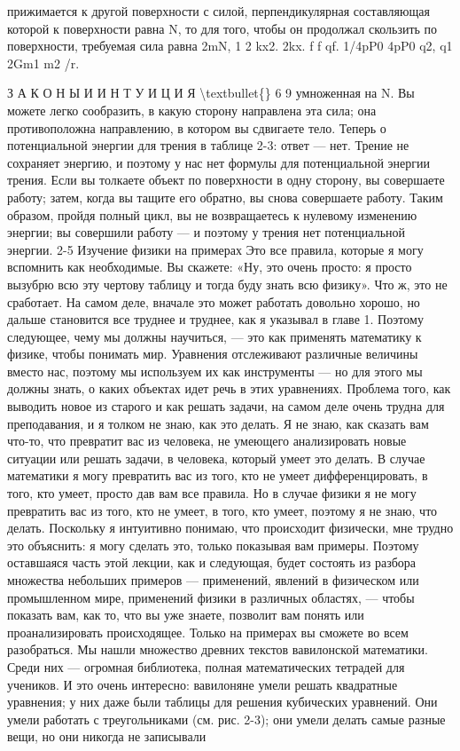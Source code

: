 \documentclass[10pt,oneside]{article}
\begin{document}
прижимается к другой поверхности с силой, перпендикулярная составляющая которой к поверхности равна N, то для того, чтобы он продолжал скользить по поверхности, требуемая сила равна 2mN, 1 2 kx2. 2kx. f f qf. 1/4pP0 4pP0 q2, q1 2Gm1  m2  /r.\par

З А К О Н Ы  И  И Н Т У И Ц И Я \textbackslash{}textbullet\{\} 6 9 умноженная на N. Вы можете легко сообразить, в какую сторону направлена эта сила; она противоположна направлению, в котором вы сдвигаете тело. Теперь о потенциальной энергии для трения в таблице 2-3: ответ --- нет. Трение не сохраняет энергию, и поэтому у нас нет формулы для потенциальной энергии трения. Если вы толкаете объект по поверхности в одну сторону, вы совершаете работу; затем, когда вы тащите его обратно, вы снова совершаете работу. Таким образом, пройдя полный цикл, вы не возвращаетесь к нулевому изменению энергии; вы совершили работу --- и поэтому у трения нет потенциальной энергии. 2-5 Изучение физики на примерах Это все правила, которые я могу вспомнить как необходимые. Вы скажете: «Ну, это очень просто: я просто вызубрю всю эту чертову таблицу и тогда буду знать всю физику». Что ж, это не сработает. На самом деле, вначале это может работать довольно хорошо, но дальше становится все труднее и труднее, как я указывал в главе 1. Поэтому следующее, чему мы должны научиться, --- это как применять математику к физике, чтобы понимать мир. Уравнения отслеживают различные величины вместо нас, поэтому мы используем их как инструменты --- но для этого мы должны знать, о каких объектах идет речь в этих уравнениях. Проблема того, как выводить новое из старого и как решать задачи, на самом деле очень трудна для преподавания, и я толком не знаю, как это делать. Я не знаю, как сказать вам что-то, что превратит вас из человека, не умеющего анализировать новые ситуации или решать задачи, в человека, который умеет это делать. В случае математики я могу превратить вас из того, кто не умеет дифференцировать, в того, кто умеет, просто дав вам все правила. Но в случае физики я не могу превратить вас из того, кто не умеет, в того, кто умеет, поэтому я не знаю, что делать. Поскольку я интуитивно понимаю, что происходит физически, мне трудно это объяснить: я могу сделать это, только показывая вам примеры. Поэтому оставшаяся часть этой лекции, как и следующая, будет состоять из разбора множества небольших примеров --- применений, явлений в физическом или промышленном мире, применений физики в различных областях, --- чтобы показать вам, как то, что вы уже знаете, позволит вам понять или проанализировать происходящее. Только на примерах вы сможете во всем разобраться. Мы нашли множество древних текстов вавилонской математики. Среди них --- огромная библиотека, полная математических тетрадей для учеников. И это очень интересно: вавилоняне умели решать квадратные уравнения; у них даже были таблицы для решения кубических уравнений. Они умели работать с треугольниками (см. рис. 2-3); они умели делать самые разные вещи, но они никогда не записывали\par
\end{document}
